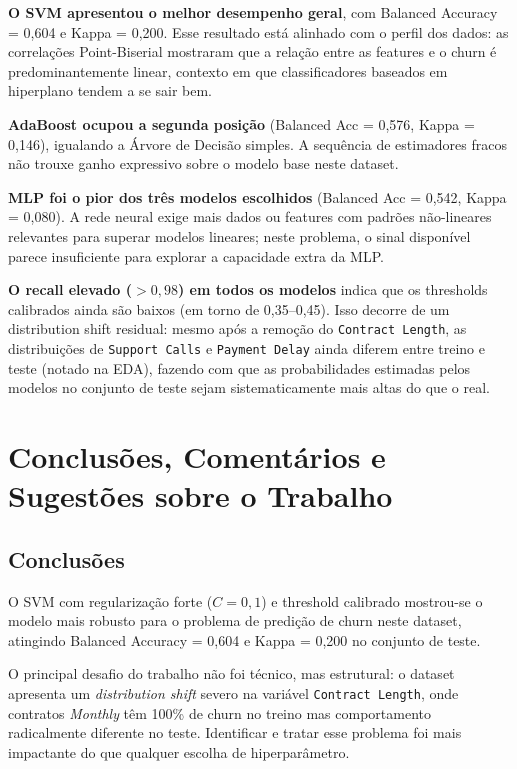 \documentclass[12pt, a4paper]{article}
\begin{document}
\textbf{O SVM apresentou o melhor desempenho geral}, com Balanced Accuracy = 0,604
e Kappa = 0,200. Esse resultado está alinhado com o perfil dos dados: as correlações
Point-Biserial mostraram que a relação entre as features e o churn é predominantemente
linear, contexto em que classificadores baseados em hiperplano tendem a se sair bem.

\textbf{AdaBoost ocupou a segunda posição} (Balanced Acc = 0,576, Kappa = 0,146),
igualando a Árvore de Decisão simples. A sequência de estimadores fracos não trouxe
ganho expressivo sobre o modelo base neste dataset.

\textbf{MLP foi o pior dos três modelos escolhidos} (Balanced Acc = 0,542, Kappa = 0,080).
A rede neural exige mais dados ou features com padrões não-lineares relevantes para
superar modelos lineares; neste problema, o sinal disponível parece insuficiente para
explorar a capacidade extra da MLP.

\textbf{O recall elevado ($> 0{,}98$) em todos os modelos} indica que os thresholds
calibrados ainda são baixos (em torno de 0,35--0,45). Isso decorre de um distribution
shift residual: mesmo após a remoção do \texttt{Contract Length}, as distribuições
de \texttt{Support Calls} e \texttt{Payment Delay} ainda diferem entre treino e
teste (notado na EDA), fazendo com que as probabilidades estimadas pelos modelos
no conjunto de teste sejam sistematicamente mais altas do que o real.

\section{Conclusões, Comentários e Sugestões sobre o Trabalho}

\subsection{Conclusões}

O SVM com regularização forte ($C = 0{,}1$) e threshold calibrado mostrou-se o
modelo mais robusto para o problema de predição de churn neste dataset, atingindo
Balanced Accuracy = 0,604 e Kappa = 0,200 no conjunto de teste.

O principal desafio do trabalho não foi técnico, mas estrutural: o dataset apresenta
um \textit{distribution shift} severo na variável \texttt{Contract Length}, onde
contratos \textit{Monthly} têm 100\% de churn no treino mas comportamento radicalmente
diferente no teste. Identificar e tratar esse problema foi mais impactante do que
qualquer escolha de hiperparâmetro.
\end{document}
